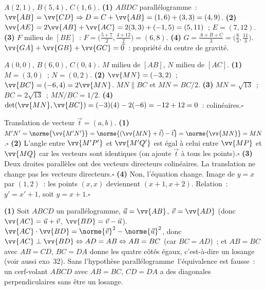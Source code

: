 $A(2,1)$, $B(5,4)$, $C(1,6)$.
\textbf{(1)} $ABDC$ parall\'elogramme~: $\vv{AB}=\vv{CD}\Rightarrow D=C+\vv{AB}=(1,6)+(3,3)=(4,9)$.
\textbf{(2)} $\vv{AE}=2\vv{AB}+\vv{AC}=2(3,3)+(-1,5)=(5,11)$~; $E=(7,12)$.
\textbf{(3)} $F$ milieu de $[BE]$~: $F=\bigl(\frac{5+7}{2},\frac{4+12}{2}\bigr)=(6,8)$.
\textbf{(4)} $G=\frac{A+B+C}{3}=\bigl(\frac{8}{3},\frac{11}{3}\bigr)$.
$\vv{GA}+\vv{GB}+\vv{GC}=\vec{0}$~: propri\'et\'e du centre de gravité.\checkmark


$A(0,0)$, $B(6,0)$, $C(0,4)$. $M$ milieu de $[AB]$, $N$ milieu de $[AC]$.
\textbf{(1)} $M=(3,0)$~; $N=(0,2)$.
\textbf{(2)} $\vv{MN}=(-3,2)$~; $\vv{BC}=(-6,4)=2\vv{MN}$.
$MN\parallel BC$ et $MN=BC/2$.
\textbf{(3)} $MN=\sqrt{13}$~; $BC=2\sqrt{13}$~; $MN/BC=1/2$.
\textbf{(4)} $\det(\vv{MN},\vv{BC})=(-3)(4)-2(-6)=-12+12=0$~: colin\'eaires.\checkmark\hfill$\square$


Translation de vecteur $\vec{t}=(a,b)$.
\textbf{(1)} $M'N'=\norme{\vv{M'N'}}=\norme{(\vv{MN}+\vec{t})-\vec{t}}=\norme{\vv{MN}}=MN$.\hfill$\square$
\textbf{(2)} L'angle entre $\vv{M'P'}$ et $\vv{M'Q'}$ est \'egal \`a celui entre $\vv{MP}$ et $\vv{MQ}$
car les vecteurs sont identiques (on ajoute $\vec{t}$ \`a tous les points).\hfill$\square$
\textbf{(3)} Deux droites parall\`eles ont des vecteurs directeurs colin\'eaires.
La translation ne change pas les vecteurs directeurs.\hfill$\square$
\textbf{(4)} Non, l'\'equation change.
Image de $y=x$ par $(1,2)$~: les points $(x,x)$ deviennent $(x+1,x+2)$.
Relation~: $y'=x'+1$, soit $y=x+1$.\hfill$\square$


\textbf{(1)} Soit $ABCD$ un parall\'elogramme, $\vec u=\vv{AB}$, $\vec v=\vv{AD}$ (donc $\vv{AC}=\vec u+\vec v$, $\vv{BD}=\vec v-\vec u$).
$\vv{AC}\cdot\vv{BD}=\norme{\vec v}^2-\norme{\vec u}^2$, donc $\vv{AC}\perp\vv{BD}\Leftrightarrow AD=AB\Leftrightarrow AB=BC$ (car $BC=AD$)~; et $AB=BC$ avec $AB=CD$, $BC=DA$ donne les quatre c\^ot\'es \'egaux, c'est-\`a-dire un losange (voir aussi exo~32).
Sans l'hypoth\`ese \og parall\'elogramme\fg\ l'\'equivalence est fausse~: un cerf-volant $ABCD$ avec $AB=BC$, $CD=DA$ a des diagonales perpendiculaires sans \^etre un losange.

